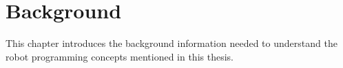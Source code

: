 \chapter{Background} \label{sec:background}
This chapter introduces the background information needed to understand the robot programming concepts mentioned in this thesis.





